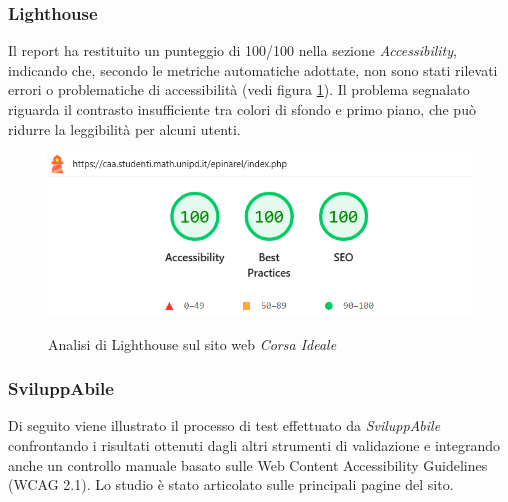 \subsubsection{Lighthouse}
\noindent Il report ha restituito un punteggio di 100/100 nella sezione \textit{Accessibility}, indicando che, secondo le metriche automatiche adottate, non sono stati rilevati errori o problematiche di accessibilità (vedi figura \ref{fig:Lighthouse_corsaideale}). 
Il problema segnalato riguarda il contrasto insufficiente tra colori di sfondo e primo piano, che può ridurre la leggibilità per alcuni utenti. 
\begin{figure}[H]
    \centering
    \includegraphics[width=0.6\linewidth, alt={Screenshot dell'analisi di Lighthouse sul sito web Corsa Ideale}]{img/Lighthouse_corsaideale.png}
    \caption{Analisi di Lighthouse sul sito web \textit{Corsa Ideale}}\label{fig:Lighthouse_corsaideale}
\end{figure}

\subsubsection{SviluppAbile}
\noindent Di seguito viene illustrato il processo di test effettuato da \textit{SviluppAbile} confrontando i risultati ottenuti dagli altri strumenti di validazione e integrando anche un controllo manuale basato sulle Web Content Accessibility Guidelines (WCAG 2.1). Lo studio è stato articolato sulle principali pagine del sito.\\

